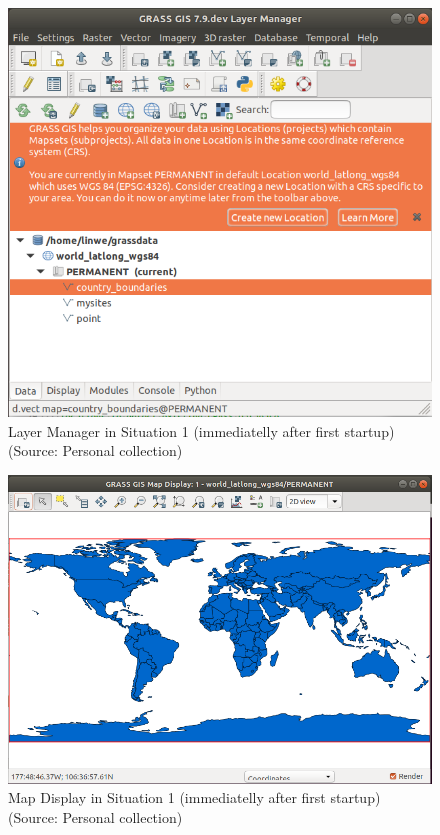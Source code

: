 \documentclass[a4paper,10pt,twoside]{article}
\begin{document}
\vspace{0.3cm}
\begin{figure}[hbt!] 
\begin{center}
\includegraphics[width=12cm]{../pictures/lmgr1.png} 
\caption[Layer Manager in Situation 1 (immediatelly after first startup)]{Layer Manager in Situation 1 (immediatelly after first startup) (Source: Personal collection)}
\label{fig:lmgr1}
\end{center}
\end{figure}

\vspace{0.3cm}
\begin{figure}[hbt!] 
\begin{center}
\includegraphics[width=13cm]{../pictures/mapdisplay1.png} 
\caption[Map Display in Situation 1 (immediatelly after first startup)]{Map Display in Situation 1 (immediatelly after first startup) (Source: Personal collection)}
\label{fig:mapdisplay1}
\end{center}
\end{figure}
\end{document}
